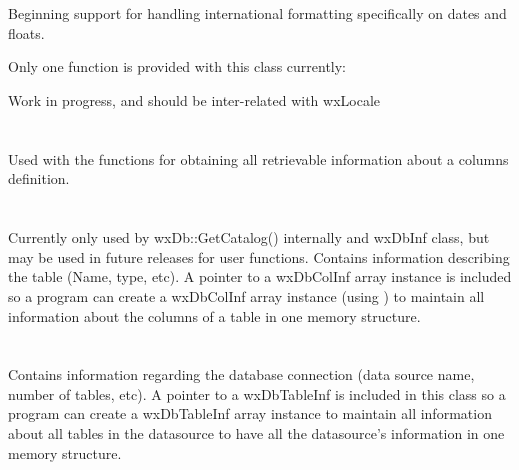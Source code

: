 \begin{indented}{1cm}

\section{}\label{wxdbcolfor}
Beginning support for handling international formatting specifically on dates and floats.  

Only one function is provided with this class currently:

\label{wxdbcolforformat}

Work in progress, and should be inter-related with wxLocale


\section{}\label{wxdbcolinf}
Used with the  functions for obtaining all retrievable information about a columns definition.


\section{}\label{wxdbtableinf}
Currently only used by wxDb::GetCatalog() internally and wxDbInf class,
but may be used in future releases for  user functions.  Contains information
describing the table (Name, type, etc). A pointer to a wxDbColInf array 
instance is included so a program can create a wxDbColInf array instance
(using ) to maintain all information about the columns
of a table in one memory structure.


\section{}\label{wxdbinf}
Contains information regarding the database connection (data source name, 
number of tables, etc).  A pointer to a wxDbTableInf is included in this 
class so a program can create a wxDbTableInf array instance to maintain all
information about all tables in the datasource to have all the datasource's
information in one memory structure.

\end{indented}


